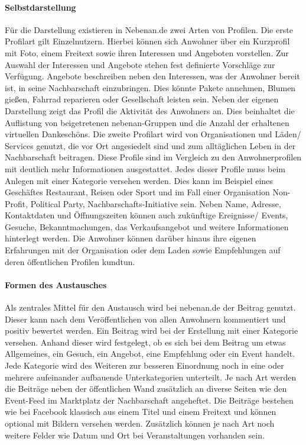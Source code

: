 \paragraph{Selbstdarstellung}

Für die Darstellung existieren in Nebenan.de zwei Arten von Profilen. Die erste Profilart gilt Einzelnutzern. Hierbei können sich Anwohner über ein Kurzprofil mit Foto, einem Freitext sowie ihren Interessen und Angeboten vorstellen. Zur Auswahl der Interessen und Angebote stehen fest definierte Vorschläge zur Verfügung. Angebote beschreiben neben den Interessen, was der Anwohner bereit ist, in seine Nachbarschaft einzubringen. Dies könnte \bspw Pakete annehmen, Blumen gießen, Fahrrad reparieren oder Gesellschaft leisten sein.
Neben der eigenen Darstellung zeigt das Profil die Aktivität des Anwohners an. Dies beinhaltet \bspw die Auflistung von beigetretenen nebenan-Gruppen und die Anzahl der erhaltenen virtuellen Dankeschöns.
Die zweite Profilart wird von Organisationen und Läden/ Services genutzt, die vor Ort angesiedelt sind und zum alltäglichen Leben in der Nachbarschaft beitragen. Diese Profile sind im Vergleich zu den Anwohnerprofilen mit deutlich mehr Informationen ausgestattet. Jedes dieser Profile muss beim Anlegen mit einer Kategorie versehen werden. Dies kann im Beispiel eines Geschäftes \zB Restaurant, Reisen oder Sport und im Fall einer Organisation Non-Profit, Political Party, Nachbarschafts-Initiative \usw sein. Neben Name, Adresse, Kontaktdaten und Öffnungszeiten können auch zukünftige Ereignisse/ Events, Gesuche, Bekanntmachungen, das Verkaufsangebot und weitere Informationen hinterlegt werden. Die Anwohner können darüber hinaus ihre eigenen Erfahrungen mit der Organisation oder dem Laden sowie Empfehlungen auf deren öffentlichen Profilen kundtun.

\paragraph{Formen des Austausches}

Als zentrales Mittel für den Austausch wird bei nebenan.de der Beitrag genutzt. Dieser kann nach dem Veröffentlichen von allen Anwohnern kommentiert und positiv bewertet werden. Ein Beitrag wird bei der Erstellung mit einer Kategorie versehen. Anhand dieser wird festgelegt, ob es sich bei dem Beitrag um etwas Allgemeines, ein Gesuch, ein Angebot, eine Empfehlung oder ein Event handelt. Jede Kategorie wird des Weiteren zur besseren Einordnung noch in eine oder mehrere aufeinander aufbauende Unterkategorien unterteilt. Je nach Art werden die Beiträge neben der öffentlichen Wand zusätzlich an diverse Seiten wie \zB den Event-Feed im Marktplatz der Nachbarschaft angeheftet.
Die Beiträge bestehen wie bei Facebook klassisch aus einem Titel und einem Freitext und können optional mit Bildern versehen werden. Zusätzlich können je nach Art noch weitere Felder wie \zB Datum und Ort bei Veranstaltungen vorhanden sein.

